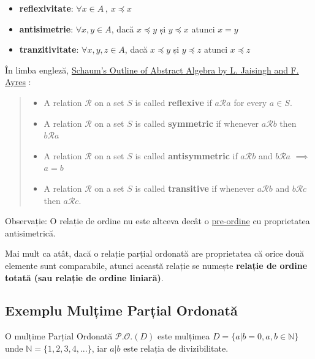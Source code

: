 \documentclass[letterpaper,10pt,english]{/usr/local/lib/python2.7/dist-packages/sphinx/texinputs/sphinxhowto}
\begin{document}
\begin{itemize}
\itemsep1pt\parskip0pt
\item
  \textbf{reflexivitate}: $\forall x\in A\,,\ x\preceq x$
\item
  \textbf{antisimetrie}: $\forall x,y\in A$, dacă $x \preceq y$ și
  $y\preceq x$ atunci $x=y$
\item
  \textbf{tranzitivitate}: $\forall x,y,z\in A$, dacă $x\preceq y$ și
  $y\preceq z$ atunci $x\preceq z$
\end{itemize}

În limba engleză,
\href{http://www.amazon.com/Schaums-Outline-Abstract-Algebra-Outlines/dp/0071403272}{Schaum's
Outline of Abstract Algebra by L. Jaisingh and F. Ayres} :

\begin{quote}
\begin{itemize}
\itemsep1pt\parskip0pt
\item
  A relation $\mathcal{R}$ on a set $S$ is called \textbf{reflexive} if
  $a  \mathcal{R}  a$ for every $a \in S$.
\item
  A relation $\mathcal{R}$ on a set $S$ is called \textbf{symmetric} if
  whenever $a \mathcal{R} b$ then $b \mathcal{R} a$
\item
  A relation $\mathcal{R}$ on a set $S$ is called \textbf{antisymmetric}
  if $a \mathcal{R} b$ and $b \mathcal{R} a$ $\implies$ $a=b$
\item
  A relation $\mathcal{R}$ on a set $S$ is called \textbf{transitive} if
  whenever $a \mathcal{R} b$ and $b \mathcal{R} c$ then
  $a \mathcal{R} c$.
\end{itemize}
\end{quote}Observație: O relație de ordine nu este altceva decât o
\href{https://en.wikipedia.org/wiki/Preorder}{pre-ordine} cu
proprietatea antisimetrică.

Mai mult ca atât, dacă o relație parțial ordonată are proprietatea că
orice două elemente sunt comparabile, atunci această relație se numește
\textbf{relație de ordine totată (sau relație de ordine liniară)}.\subsection{Exemplu Mulțime Parțial
Ordonată}\label{exemplu-mulux21bime-parux21bial-ordonatux103}

O mulțime Parțial Ordonată $\mathcal{P.O.}(D)$ este mulțimea
$D= \{ a|b =0, a,b \in \mathbb{N} \}$ unde
$\mathbb{N} = \{1,2,3,4,...\}$, iar $a|b$ este relația de
divizibilitate.
\end{document}
